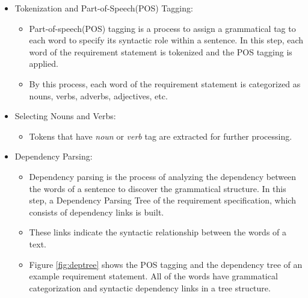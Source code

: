 \begin{itemize}
    \item Tokenization and Part-of-Speech(POS) Tagging:
        \begin{itemize}
            \item Part-of-speech(POS) tagging is a process to assign a grammatical tag to each word to specify its syntactic role within a sentence. In this step, each word of the requirement statement is tokenized and the POS tagging is applied.
            \item By this process, each word of the requirement statement is categorized as nouns, verbs, adverbs, adjectives, etc.
        \end{itemize}


    \item Selecting Nouns and Verbs:
        \begin{itemize}
            \item Tokens that have \textit{noun} or \textit{verb} tag are extracted for further processing.
        \end{itemize}
    \item Dependency Parsing:
        \begin{itemize}
            \item Dependency parsing is the process of analyzing the dependency between the words of a sentence to discover the grammatical structure. In this step, a Dependency Parsing Tree of the requirement specification, which consists of dependency links is built.
            \item These links indicate the syntactic relationship between the words of a text.
            \item Figure \ref{fig:deptree} shows the POS tagging and the dependency tree of an example requirement statement. All of the words have grammatical categorization and syntactic dependency links in a tree structure.
        \end{itemize}


\end{itemize}

